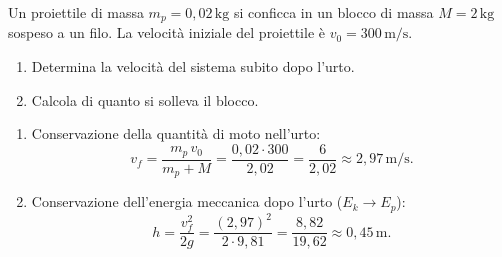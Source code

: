 \begin{question}[ID=3.2, subtitle={Pendolo balistico: altezza raggiunta dal blocco}, tags={urti anelastici, sistema chiuso}, difficulty=media]
Un proiettile di massa \(m_p = 0{,}02 \, \text{kg}\) si conficca in un blocco di massa \(M = 2 \, \text{kg}\) sospeso a un filo. La velocità iniziale del proiettile è \(v_0 = 300 \, \text{m/s}\).
\begin{enumerate}
    \item Determina la velocità del sistema subito dopo l'urto.
    \item Calcola di quanto si solleva il blocco.
\end{enumerate}
\begin{solution}
    \begin{enumerate}
        \item Conservazione della quantità di moto nell'urto:
        \[
            v_f = \frac{m_p \, v_0}{m_p + M} = \frac{0{,}02 \cdot 300}{2{,}02} = \frac{6}{2{,}02} \approx 2{,}97 \, \text{m/s}.
        \]
        \item Conservazione dell'energia meccanica dopo l'urto (\(E_k \to E_p\)):
        \[
            h = \frac{v_f^2}{2g} = \frac{(2{,}97)^2}{2 \cdot 9{,}81} = \frac{8{,}82}{19{,}62} \approx 0{,}45 \, \text{m}.
        \]
    \end{enumerate}
\end{solution}
\end{question}


